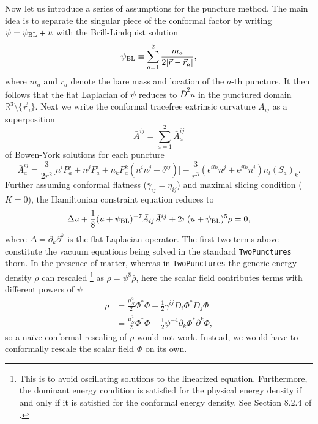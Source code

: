 Now let us introduce a series of assumptions for the puncture method.
The main idea is to separate the singular piece of the conformal factor by writing
$ \psi = \psi_{\rm BL} + u $
with the Brill-Lindquist solution
\begin{equation}
    \psi_{\rm BL} \equiv \sum_{a=1}^2 \frac{m_a}{2|\vec{r} - \vec{r}_a|},
\end{equation}
where $m_a$ and $r_a$ denote the bare mass and location of the $a$-th puncture.
It then follows that the flat Laplacian of $\psi$ reduces to $\bar{D}^2 u$ in the punctured domain
$\mathbb{R}^3\setminus\{\vec{r}_i\}$.
Next we write the conformal tracefree extrinsic curvature $\bar{A}_{ij}$ as a superposition
\begin{equation}
    \bar{A}^{ij} = \sum_{a=1}^2 \bar{A}_a^{ij}
\end{equation}
of Bowen-York solutions for each puncture
\begin{equation}
    \bar{A}_a^{ij} = \frac{3}{2r^2} \Big[
        n^i P_a^j + n^j P_a^i + n_k P_a^k (n^i n^j - \delta^{ij}) \Big]
        - \frac{3}{r^3} (\epsilon^{ilk} n^j + \epsilon^{jlk} n^i) n_l {(S_a)}_k.
\end{equation}
Further assuming conformal flatness ($\bar{\gamma}_{ij} = \eta_{ij}$) and maximal slicing condition ($K=0$), the Hamiltonian constraint equation reduces to
\begin{equation}
    \Delta u + \frac{1}{8} (u+\psi_{\rm BL} )^{-7} \bar{A}_{ij} \bar{A}^{ij}
    + 2\pi (u+\psi_{\rm BL})^5 \rho = 0,
    \label{eq:ham_twopunctures}
\end{equation}
where $\Delta=\partial_k \partial^k$ is the flat Laplacian operator.
The first two terms above constitute the vacuum equations being solved in the standard \texttt{TwoPunctures} thorn.
In the presence of matter, whereas in \texttt{TwoPunctures} the generic energy density $\rho$ can rescaled
\footnote{
This is to avoid oscillating solutions to the linearized equation.
Furthermore, the dominant energy condition is satisfied for the 
physical energy density if and only if it is satisfied for the conformal energy density.
See Section 8.2.4 of \cite{Gourgoulhon:2007ue}.
} as $\rho = \psi^8 \bar{\rho}$,
here the scalar field contributes terms with different powers of $\psi$
\begin{align}
    \rho
    &= \frac{\mu_S^2}{2} \Phi^* \Phi
    + \frac{1}{2} \gamma^{ij} D_i\Phi^* D_j \Phi
    \nonumber
    \\
    &= \frac{\mu_S^2}{2} \Phi^* \Phi
    + \frac{1}{2} \psi^{-4} \partial_k\Phi^* \partial^k \Phi,
    \label{eq:rho}
\end{align}
so a na\"{i}ve conformal rescaling of $\rho$ would not work.
Instead, we would have to conformally rescale the scalar field $\Phi$ on its own.

